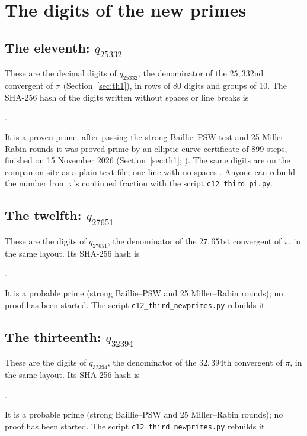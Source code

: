 \chapter{The digits of the new primes}\label{app:prime}
\addednote{\revC}

\section*{The eleventh: $q_{25332}$}

These are the \ThDigits{} decimal digits of $q_{25332}$, the denominator of the $25{,}332$nd convergent of $\pi$ (Section~\ref{sec:th1}), in rows of 80 digits and groups of 10. The SHA-256 hash of the digits written without spaces or line breaks is
\begin{center}\texttt{\ThSha}.\end{center}
\noindent It is a proven prime: after passing the strong Baillie--PSW test and 25 Miller--Rabin rounds it was proved prime by an elliptic-curve certificate of 899 steps, finished on 15 November 2026 (Section~\ref{sec:th1}; \citealp{FactorDBq25332}). \addedon{\revG} The same digits are on the companion site as a plain text file, one line with no spaces \citep{RhythmSite}. Anyone can rebuild the number from $\pi$'s continued fraction with the script \texttt{c12\_third\_pi.py}.



\section*{The twelfth: $q_{27651}$}

These are the \TwDigits{} digits of $q_{27651}$, the denominator of the $27{,}651$st convergent of $\pi$, in the same layout. Its SHA-256 hash is
\begin{center}\texttt{\TwSha}.\end{center}
\noindent It is a probable prime (strong Baillie--PSW and 25 Miller--Rabin rounds); no proof has been started. The script \texttt{c12\_third\_newprimes.py} rebuilds it.



\section*{The thirteenth: $q_{32394}$}

These are the \TtDigits{} digits of $q_{32394}$, the denominator of the $32{,}394$th convergent of $\pi$, in the same layout. Its SHA-256 hash is
\begin{center}\texttt{\TtSha}.\end{center}
\noindent It is a probable prime (strong Baillie--PSW and 25 Miller--Rabin rounds); no proof has been started. The script \texttt{c12\_third\_newprimes.py} rebuilds it.

